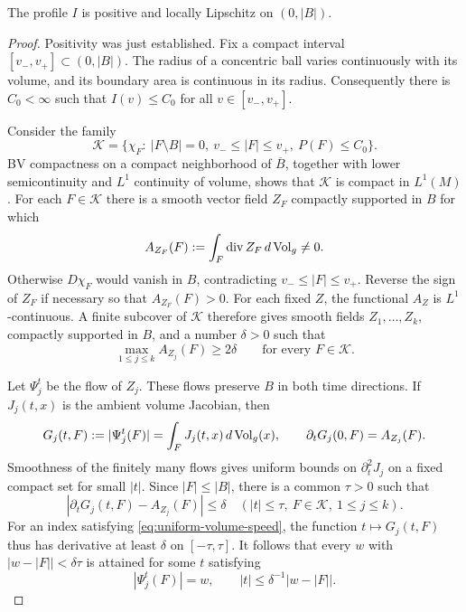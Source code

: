 \begin{lemma}
 \label{lem:profile-lipschitz}
The profile $I$ is positive and locally Lipschitz on $(0,|B|)$.
\end{lemma}

\begin{proof}
Positivity was just established.  Fix a compact interval
$[v_-,v_+]\subset(0,|B|)$.  The radius of a concentric ball varies
continuously with its volume, and its boundary area is continuous in
its radius.  Consequently there is $C_0<\infty$ such that
$I(v)\le C_0$ for all $v\in[v_-,v_+]$.

Consider the family
\[
 \mathcal K=\bigl\{\chi_F:\ |F\setminus B|=0,
       \ v_-\le |F|\le v_+,\ P(F)\le C_0\bigr\}.
\]
BV compactness on a compact neighborhood of $\overline B$, together
with lower semicontinuity and $L^1$ continuity of volume, shows that
$\mathcal K$ is compact in $L^1(M)$.  For each $F\in\mathcal K$ there
is a smooth vector field $Z_F$ compactly supported in $B$ for which
\[
 A_{Z_F}(F):=\int_F\operatorname{div} Z_F\,d\operatorname{Vol}_g\ne0.
\]
Otherwise $D\chi_F$ would vanish in $B$, contradicting
$v_-\le |F|\le v_+$.  Reverse the sign of $Z_F$ if necessary so that
$A_{Z_F}(F)>0$.  For each fixed $Z$, the functional $A_Z$ is
$L^1$-continuous.  A finite subcover of $\mathcal K$ therefore gives
smooth fields $Z_1,\ldots,Z_k$, compactly supported in $B$, and a
number $\delta>0$ such that
\begin{equation}
 \label{eq:uniform-volume-speed}
 \max_{1\le j\le k} A_{Z_j}(F)\ge 2\delta
 \qquad\text{for every }F\in\mathcal K.
\end{equation}

Let $\Psi_j^t$ be the flow of $Z_j$.  These flows preserve $B$ in
both time directions.  If $J_j(t,x)$ is the ambient volume Jacobian,
then
\[
 G_j(t,F):=|\Psi_j^t(F)|=\int_F J_j(t,x)\,d\operatorname{Vol}_g(x),
 \qquad \partial_tG_j(0,F)=A_{Z_j}(F).
\]
Smoothness of the finitely many flows gives uniform bounds on
$\partial_t^2J_j$ on a fixed compact set for small $|t|$.
Since $|F|\le |B|$, there is a common $\tau>0$ such that
\[
 |\partial_tG_j(t,F)-A_{Z_j}(F)|\le\delta
 \quad (|t|\le\tau,\ F\in\mathcal K,\ 1\le j\le k).
\]
For an index satisfying \eqref{eq:uniform-volume-speed}, the function
$t\mapsto G_j(t,F)$ thus has derivative at least $\delta$ on
$[-\tau,\tau]$.  It follows that every $w$ with
$|w-|F||<\delta\tau$ is attained for some $t$ satisfying
\begin{equation}
 \label{eq:volume-adjustment-time}
 |\Psi_j^t(F)|=w,\qquad |t|\le \delta^{-1}|w-|F||.
\end{equation}


\end{proof}
